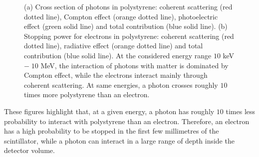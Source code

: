 \begin{figure}[h]
\begin{subfigure}[t]{0.48\textwidth}
    \captionsetup{justification=justified}
    \caption{
      \label{subfig:electron}}
  \end{subfigure}
  \caption{(a) Cross section of photons in polystyrene: coherent scattering (red dotted line), Compton effect (orange dotted line), photoelectric effect (green solid line) and total contribution (blue solid line).
    (b) Stopping power for electrons in polystyrene: coherent scattering (red dotted line), radiative effect (orange dotted line) and total contribution (blue solid line).
    At the considered energy range $10$ keV $ -\; 10$ MeV, the interaction of photons with matter is dominated by Compton effect, while the electrons interact mainly through coherent scattering.
    At same energies, a photon crosses roughly $10$ times more polystyrene than an electron.
    \label{fig:particle_attenuation}}
\end{figure}
These figures highlight that, at a given energy, a photon has roughly $10$ times less probability to interact with polystyrene than an electron.
Therefore, an electron has a high probability to be stopped in the first few millimetres of the scintillator, while a photon can interact in a large range of depth inside the detector volume.

